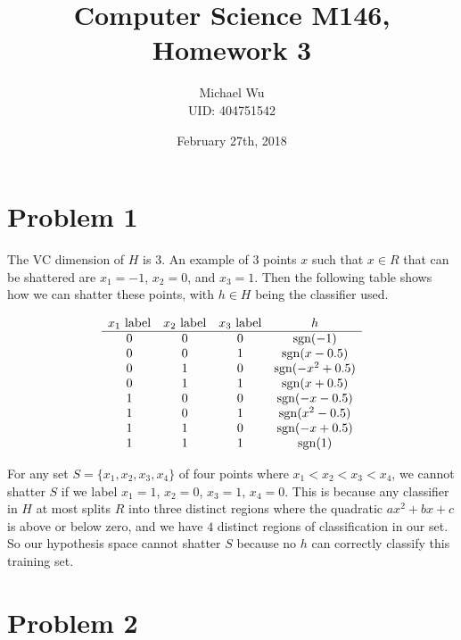 \documentclass[12pt]{article}
\begin{document}
\title{Computer Science M146, Homework 3}
\date{February 27th, 2018}
\author{Michael Wu\\UID: 404751542}
\maketitle

\section*{Problem 1}

The VC dimension of \(H\) is \(3\). An example of \(3\) points \(x\) such that \(x\in R\) that can be shattered are \(x_1=-1\),
\(x_2=0\), and \(x_3=1\). Then the following table shows how we can shatter these points, with \(h\in H\) being the classifier used.

\[
        \begin{array}{c c c c}
                x_1 \text{ label}& x_2 \text{ label}& x_3 \text{ label} & h\\
                \hline
                0 & 0 & 0 & \operatorname{sgn}(-1)\\
                0 & 0 & 1 & \operatorname{sgn}(x-0.5)\\
                0 & 1 & 0 & \operatorname{sgn}(-x^2+0.5)\\
                0 & 1 & 1 & \operatorname{sgn}(x+0.5)\\
                1 & 0 & 0 & \operatorname{sgn}(-x-0.5)\\
                1 & 0 & 1 & \operatorname{sgn}(x^2-0.5)\\
                1 & 1 & 0 & \operatorname{sgn}(-x+0.5)\\
                1 & 1 & 1 & \operatorname{sgn}(1)\\
        \end{array}
\]

For any set \(S=\{x_1,x_2,x_3,x_4\}\) of four points where \(x_1<x_2<x_3<x_4\), we cannot shatter \(S\) if we label \(x_1=1\), \(x_2=0\),
\(x_3=1\), \(x_4=0\). This is because any classifier in \(H\) at most splits \(R\) into three distinct regions where the quadratic
\(ax^2+bx+c\) is above or below zero, and we have \(4\) distinct regions of classification in our set. So our hypothesis space cannot
shatter \(S\) because no \(h\) can correctly classify this training set.

\section*{Problem 2}
\end{document}
